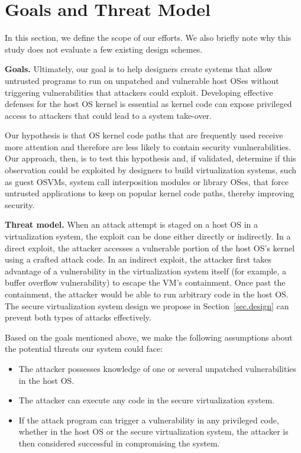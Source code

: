\section{Goals and Threat Model}
\label{sec.motivation-and-background}

In this section, we define the scope of our efforts. We also briefly note why
this study does not evaluate a few existing design schemes.

\noindent
\textbf{Goals.}
Ultimately, our goal is to help designers
create systems that allow untrusted programs to
run on unpatched and vulnerable host OSes without triggering vulnerabilities that
attackers could exploit.
Developing effective defenses for the host OS kernel is essential as kernel code
can expose privileged access to attackers that could lead to a system take-over.

Our hypothesis is that OS kernel code paths that are frequently used receive
more attention and therefore are less likely to contain security vunlnerabilities.
Our approach, then, is to test this hypothesis and, if validated, determine
if this observation could be exploited by designers to build
virtualization systems, such as guest OSVMs, system call interposition modules
or library OSes, that force untrusted applications to keep on popular kernel
code paths, thereby improving security.



\noindent
\textbf{Threat model.}
When an attack attempt is staged
on a host OS in a virtualization system,
the exploit can be done either directly or indirectly.
In a direct exploit, the attacker accesses a vulnerable portion of the host OS's kernel
using a crafted attack code. In an indirect exploit,
the attacker first takes advantage of a vulnerability in the virtualization system itself
(for example, a buffer overflow vulnerability)
to escape the VM's containment. Once past the containment, the attacker would be able to run arbitrary code
in the host OS.
The secure virtualization system design we propose
in Section~\ref{sec.design} can prevent both types of attacks effectively.

Based on the goals mentioned above, we make the following assumptions about the
potential threats our system could face:

\begin{itemize}\setlength\itemsep{0em}

\item The attacker possesses knowledge of one or several unpatched
vulnerabilities in the host OS.

\item The attacker can execute any code in the secure
virtualization system.

\item If the attack program can trigger a vulnerability in any privileged
code, whether in the host OS or the secure virtualization system, the attacker
is then considered successful in compromising the system.

\end{itemize}

